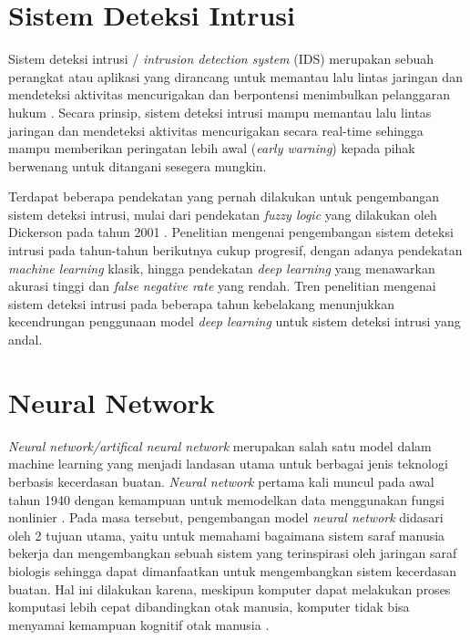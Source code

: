 \documentclass[a4paper,12pt]{report}
\begin{document}
\section{Sistem Deteksi Intrusi}

Sistem deteksi intrusi / \textit{intrusion detection system} (IDS) merupakan sebuah perangkat atau aplikasi yang dirancang untuk memantau lalu lintas jaringan dan mendeteksi aktivitas mencurigakan dan berpontensi menimbulkan pelanggaran hukum \cite{solomonIntrusionDetectionSystem2019}. Secara prinsip, sistem deteksi intrusi mampu memantau lalu lintas jaringan dan mendeteksi aktivitas mencurigakan secara real-time sehingga mampu memberikan peringatan lebih awal (\textit{early warning}) kepada pihak berwenang untuk ditangani sesegera mungkin. 

Terdapat beberapa pendekatan yang pernah dilakukan untuk pengembangan sistem deteksi intrusi, mulai dari pendekatan \textit{fuzzy logic} yang dilakukan oleh Dickerson pada tahun 2001 \cite{dickersonFuzzyIntrusionDetection2001}. Penelitian mengenai pengembangan sistem deteksi intrusi pada tahun-tahun berikutnya cukup progresif, dengan adanya pendekatan \textit{machine learning} klasik, hingga pendekatan \textit{deep learning} yang menawarkan akurasi tinggi dan \textit{false negative rate} yang rendah. Tren penelitian mengenai sistem deteksi intrusi pada beberapa tahun kebelakang menunjukkan kecendrungan penggunaan model \textit{deep learning} untuk sistem deteksi intrusi yang andal.

\section{Neural Network}

 \textit{Neural network/artifical neural network} merupakan salah satu model dalam machine learning yang menjadi landasan utama untuk berbagai jenis teknologi berbasis kecerdasan buatan. \textit{Neural network} pertama kali muncul pada awal tahun 1940 dengan kemampuan untuk memodelkan data menggunakan fungsi nonlinier \cite{qamarArtificialNeuralNetworks2023}. Pada masa tersebut, pengembangan model \textit{neural network} didasari oleh 2 tujuan utama, yaitu untuk memahami bagaimana sistem saraf manusia bekerja dan mengembangkan sebuah sistem yang terinspirasi oleh jaringan saraf biologis sehingga dapat dimanfaatkan untuk mengembangkan sistem kecerdasan buatan. Hal ini dilakukan karena, meskipun komputer dapat melakukan proses komputasi lebih cepat dibandingkan otak manusia, komputer tidak bisa menyamai kemampuan kognitif otak manusia \cite{prietoNeuralNetworksOverview2016}.
\end{document}

